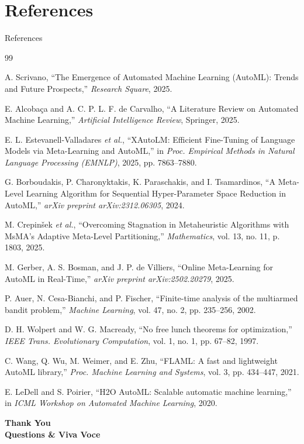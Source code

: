 \documentclass[aspectratio=169, 11pt]{beamer}
\begin{document}

\section{References}

\begin{frame}[allowframebreaks]{References}
\fontsize{6.5}{8}\selectfont
\begin{thebibliography}{99}

A. Scrivano, ``The Emergence of Automated Machine Learning (AutoML): Trends and Future Prospects,'' \textit{Research Square}, 2025.

E. Alcoba\c{c}a and A. C. P. L. F. de Carvalho, ``A Literature Review on Automated Machine Learning,'' \textit{Artificial Intelligence Review}, Springer, 2025.

E. L. Estevanell-Valladares \textit{et al.}, ``XAutoLM: Efficient Fine-Tuning of Language Models via Meta-Learning and AutoML,'' in \textit{Proc. Empirical Methods in Natural Language Processing (EMNLP)}, 2025, pp. 7863--7880.

G. Borboudakis, P. Charonyktakis, K. Paraschakis, and I. Tsamardinos, ``A Meta-Level Learning Algorithm for Sequential Hyper-Parameter Space Reduction in AutoML,'' \textit{arXiv preprint arXiv:2312.06305}, 2024.

M. Crepin\v{s}ek \textit{et al.}, ``Overcoming Stagnation in Metaheuristic Algorithms with MsMA's Adaptive Meta-Level Partitioning,'' \textit{Mathematics}, vol. 13, no. 11, p. 1803, 2025.

M. Gerber, A. S. Bosman, and J. P. de Villiers, ``Online Meta-Learning for AutoML in Real-Time,'' \textit{arXiv preprint arXiv:2502.20279}, 2025.

P. Auer, N. Cesa-Bianchi, and P. Fischer, ``Finite-time analysis of the multiarmed bandit problem,'' \textit{Machine Learning}, vol. 47, no. 2, pp. 235--256, 2002.

D. H. Wolpert and W. G. Macready, ``No free lunch theorems for optimization,'' \textit{IEEE Trans. Evolutionary Computation}, vol. 1, no. 1, pp. 67--82, 1997.

C. Wang, Q. Wu, M. Weimer, and E. Zhu, ``FLAML: A fast and lightweight AutoML library,'' \textit{Proc. Machine Learning and Systems}, vol. 3, pp. 434--447, 2021.

E. LeDell and S. Poirier, ``H2O AutoML: Scalable automatic machine learning,'' in \textit{ICML Workshop on Automated Machine Learning}, 2020.

\end{thebibliography}
\end{frame}

\begin{frame}
    \centering
    {\Huge \textbf{\textcolor{amritaMaroon}{Thank You}}} \\[0.4cm]
    {\large \textbf{Questions \& Viva Voce}}
\end{frame}
\end{document}
